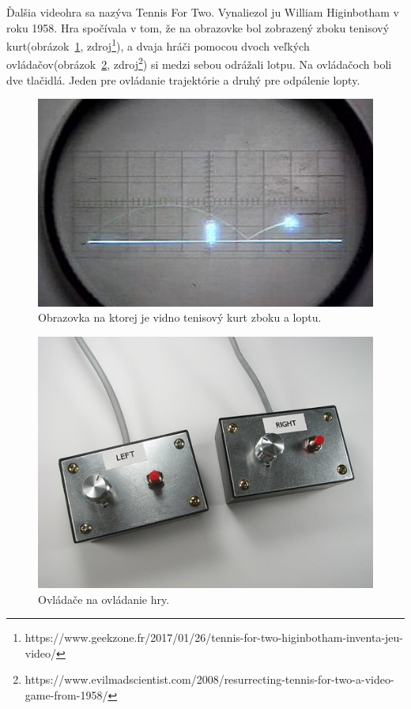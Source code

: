 \documentclass[10pt,oneside,slovak,a4paper]{article}
\begin{document}
Ďalšia videohra sa nazýva Tennis For Two. Vynaliezol ju William Higinbotham v roku 1958. Hra spočívala v tom, že na obrazovke bol zobrazený zboku tenisový kurt(obrázok~\ref{tenis}, zdroj\footnote{https://www.geekzone.fr/2017/01/26/tennis-for-two-higinbotham-inventa-jeu-video/}), a dvaja hráči pomocou dvoch veľkých ovládačov(obrázok~\ref{tenis2}, zdroj\footnote{https://www.evilmadscientist.com/2008/resurrecting-tennis-for-two-a-video-game-from-1958/}) si medzi sebou odrážali lotpu. Na ovládačoch boli dve tlačidlá. Jeden pre ovládanie trajektórie a druhý pre odpálenie lopty.

\begin{figure}[tbh]
\centering
\includegraphics[scale=0.25]{tenis.jpg}
\caption{Obrazovka na ktorej je vidno tenisový kurt zboku a loptu.}
\label{tenis}
\end{figure}

\begin{figure}[tbh]
\centering
\includegraphics[scale=0.35]{tenis2.jpg}
\caption{Ovládače na ovládanie hry.}
\label{tenis2}
\end{figure}
\end{document}
